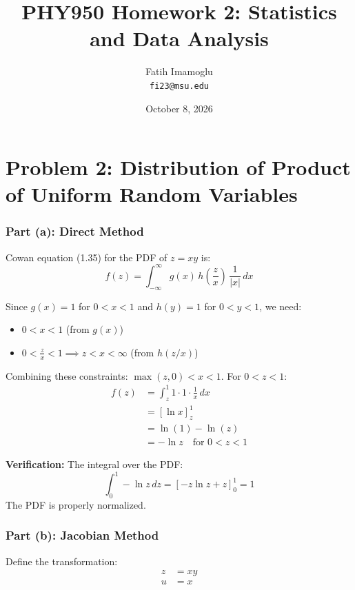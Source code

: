 \documentclass[12pt]{article}
\title{\textbf{PHY950 Homework 2: Statistics and Data Analysis}}
\author{Fatih Imamoglu \\ \texttt{fi23@msu.edu}}
\date{October 8, 2026}
\begin{document}
\maketitle
\thispagestyle{empty}
\newpage

\section{Problem 2: Distribution of Product of Uniform Random Variables}
\label{sec:problem2}

\subsubsection*{Part (a): Direct Method}
Cowan equation (1.35) for the PDF of $z = xy$ is:
\begin{equation}
f(z) = \int_{-\infty}^{\infty} g(x) \, h\left(\frac{z}{x}\right) \, \frac{1}{|x|} \, dx
\end{equation}

Since $g(x) = 1$ for $0 < x < 1$ and $h(y) = 1$ for $0 < y < 1$, we need:
\begin{itemize}
    \item $0 < x < 1$ (from $g(x)$)
    \item $0 < \frac{z}{x} < 1 \implies z < x < \infty$ (from $h(z/x)$)
\end{itemize}

Combining these constraints: $\max(z, 0) < x < 1$. For $0 < z < 1$:
\begin{align}
f(z) &= \int_{z}^{1} 1 \cdot 1 \cdot \frac{1}{x} \, dx \\
     &= \left[ \ln x \right]_{z}^{1} \\
     &= \ln(1) - \ln(z) \\
     &= -\ln z \quad \text{for } 0 < z < 1
\end{align}

\textbf{Verification:} The integral over the PDF:
\begin{equation}
\int_{0}^{1} -\ln z \, dz = \left[ -z\ln z + z \right]_{0}^{1} = 1
\end{equation}
The PDF is properly normalized.

\subsubsection*{Part (b): Jacobian Method}
Define the transformation:
\begin{align}
z &= xy \\
u &= x
\end{align}
\end{document}
